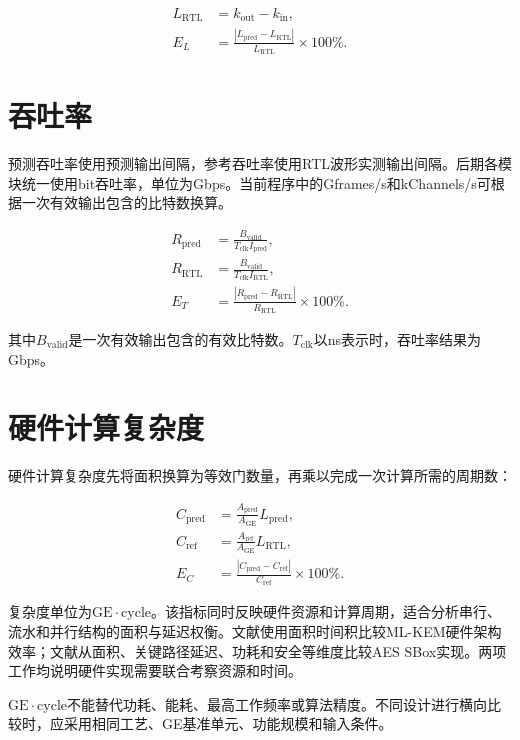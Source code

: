 \documentclass[a4paper,oneside,11pt]{ctexrep}
\begin{document}
\begin{align}
    L_{\mathrm{RTL}} &= k_{\mathrm{out}}-k_{\mathrm{in}},\\
    E_L &= \frac{|L_{\mathrm{pred}}-L_{\mathrm{RTL}}|}{L_{\mathrm{RTL}}}\times100\%.
\end{align}

\section{吞吐率}

预测吞吐率使用预测输出间隔，参考吞吐率使用RTL波形实测输出间隔。后期各模块统一使用bit吞吐率，单位为Gbps。当前程序中的Gframes/s和kChannels/s可根据一次有效输出包含的比特数换算。

\begin{align}
    R_{\mathrm{pred}} &= \frac{B_{\mathrm{valid}}}{T_{\mathrm{clk}}I_{\mathrm{pred}}},\\
    R_{\mathrm{RTL}} &= \frac{B_{\mathrm{valid}}}{T_{\mathrm{clk}}I_{\mathrm{RTL}}},\\
    E_T &= \frac{|R_{\mathrm{pred}}-R_{\mathrm{RTL}}|}{R_{\mathrm{RTL}}}\times100\%.
\end{align}

其中$B_{\mathrm{valid}}$是一次有效输出包含的有效比特数。$T_{\mathrm{clk}}$以ns表示时，吞吐率结果为Gbps。

\section{硬件计算复杂度}

硬件计算复杂度先将面积换算为等效门数量，再乘以完成一次计算所需的周期数：

\begin{align}
    C_{\mathrm{pred}} &= \frac{A_{\mathrm{pred}}}{A_{\mathrm{GE}}}L_{\mathrm{pred}},\\
    C_{\mathrm{ref}} &= \frac{A_{\mathrm{ref}}}{A_{\mathrm{GE}}}L_{\mathrm{RTL}},\\
    E_C &= \frac{|C_{\mathrm{pred}}-C_{\mathrm{ref}}|}{C_{\mathrm{ref}}}\times100\%.
\end{align}

复杂度单位为$\mathrm{GE\cdot cycle}$。该指标同时反映硬件资源和计算周期，适合分析串行、流水和并行结构的面积与延迟权衡。文献\cite{nguyen2025mlkem}使用面积时间积比较ML-KEM硬件架构效率；文献\cite{curlin2025sbox}从面积、关键路径延迟、功耗和安全等维度比较AES SBox实现。两项工作均说明硬件实现需要联合考察资源和时间。

$\mathrm{GE\cdot cycle}$不能替代功耗、能耗、最高工作频率或算法精度。不同设计进行横向比较时，应采用相同工艺、GE基准单元、功能规模和输入条件。
\end{document}
